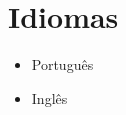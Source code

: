 \documentclass[a4paper]{simplecv}
\begin{document}
\section{Idiomas}

\begin{multicols}{3}
	\raggedcolumns
	\begin{itemize}
		\item Português
		\item Inglês
	\end{itemize}
\end{multicols}

%
\end{document}
